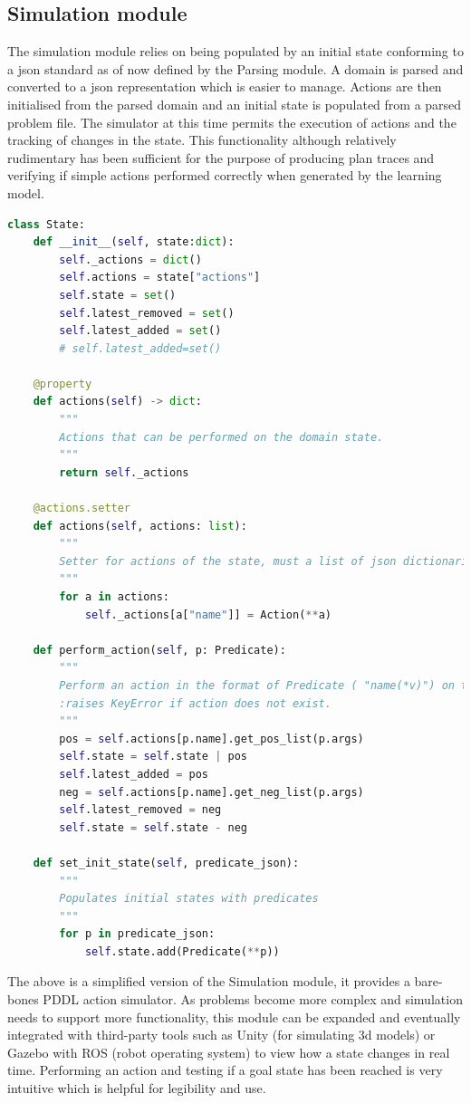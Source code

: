 \subsection{Simulation module}
The simulation module relies on being populated by an initial state conforming to a json standard as of now defined by the Parsing module.
A domain is parsed and converted to a json representation which is easier to manage.
Actions are then initialised from the parsed domain and an initial state is populated from a parsed problem file.
The simulator at this time permits the execution of actions and the tracking of changes in the state.
This functionality although relatively rudimentary has been sufficient for the purpose of producing plan traces and verifying if simple actions performed correctly when generated by the learning model.

\begin{lstlisting}[language=Python]
class State:
    def __init__(self, state:dict):
        self._actions = dict()
        self.actions = state["actions"]
        self.state = set()
        self.latest_removed = set()
        self.latest_added = set()
        # self.latest_added=set()

    @property
    def actions(self) -> dict:
        """
        Actions that can be performed on the domain state.
        """
        return self._actions

    @actions.setter
    def actions(self, actions: list):
        """
        Setter for actions of the state, must a list of json dictionaries.
        """
        for a in actions:
            self._actions[a["name"]] = Action(**a)

    def perform_action(self, p: Predicate):
        """
        Perform an action in the format of Predicate ( "name(*v)") on the state.
        :raises KeyError if action does not exist.
        """
        pos = self.actions[p.name].get_pos_list(p.args)
        self.state = self.state | pos
        self.latest_added = pos
        neg = self.actions[p.name].get_neg_list(p.args)
        self.latest_removed = neg
        self.state = self.state - neg

    def set_init_state(self, predicate_json):
        """
        Populates initial states with predicates
        """
        for p in predicate_json:
            self.state.add(Predicate(**p))
\end{lstlisting}

The above is a simplified version of the Simulation module, it provides a bare-bones PDDL action simulator.
As problems become more complex and simulation needs to support more functionality, this module can be expanded and eventually integrated with third-party tools such as Unity (for simulating 3d models) or Gazebo with ROS (robot operating system) to view how a state changes in real time.
Performing an action and testing if a goal state has been reached is very intuitive which is helpful for legibility and use.



